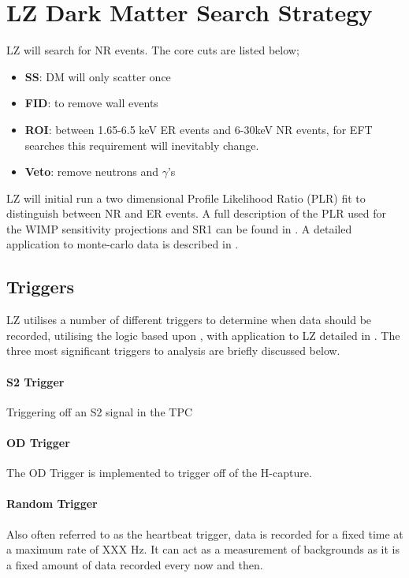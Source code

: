 \section{LZ Dark Matter Search Strategy}
\par
LZ will search for NR events.
The core cuts are listed below;
\begin{itemize}
    \item \textbf{SS}: DM will only scatter once
    \item \textbf{FID}: to remove wall events
    \item \textbf{ROI}: between 1.65-6.5 keV ER events and 6-30keV NR events, for EFT searches this requirement will inevitably change.
    \item \textbf{Veto}: remove neutrons and $\gamma$'s 
\end{itemize}

\par
LZ will initial run a two dimensional Profile Likelihood Ratio (PLR) fit to distinguish between NR and ER events.
A full description of the PLR used for the WIMP sensitivity projections and SR1 can be found in \cite{LZ_Ibles_LZStats_Thesis_ref}. 
A detailed application to monte-carlo data is described in \cite{jonathannikoleyczik_thesis_ref}.




\subsection{Triggers}
\par
LZ utilises a number of different triggers to determine when data should be recorded, utilising the logic based upon \cite{lux_trigger_logic_ref}, with application to LZ detailed in \cite{nicolasangelides_thesis_ref}.
The three most significant triggers to analysis are briefly discussed below.


\paragraph{S2 Trigger}
\par
Triggering off an S2 signal in the TPC

\paragraph{OD Trigger}
\par
The OD Trigger is implemented to trigger off of the H-capture.


\paragraph{Random Trigger}
Also often referred to as the heartbeat trigger, data is recorded for a fixed time at a maximum rate of XXX Hz.
It can act as a measurement of backgrounds as it is a fixed amount of data recorded every now and then.


